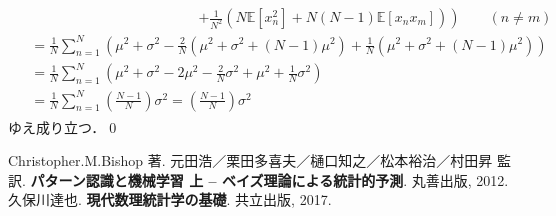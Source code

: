 \documentclass[uplatex,a4paper,oneside,openany,dvipdfmx]{jsarticle}
\numberwithin{equation}{section}
\theoremstyle{mystyle} %
\newcommand{\BE}{\mathbb{E}}
\newcommand{\tb}[1]{\textbf{#1}}
\begin{document}
\begin{description}
\begin{align}
\begin{aligned}
        &\qquad \qquad \qquad \qquad \qquad \qquad \left.+ \frac{1}{N^{2}} \left(N \BE[x_{n}^{2}] + N(N-1) \BE[x_{n}x_{m}]\right)\right) \qquad (n \neq m) \\
        &= \frac{1}{N} \sum_{n=1}^{N} \left(\mu^{2} + \sigma^{2} - \frac{2}{N} \left(\mu^{2} + \sigma^{2} + (N-1)\mu^{2}\right) + \frac{1}{N} \left(\mu^{2} + \sigma^{2} + (N-1)\mu^{2}\right)\right) \\
        &= \frac{1}{N} \sum_{n=1}^{N} \left(\mu^{2} + \sigma^{2} - 2 \mu^{2} - \frac{2}{N} \sigma^{2} + \mu^{2} + \frac{1}{N} \sigma^{2}\right) \\
        &= \frac{1}{N} \sum_{n=1}^{N} \left(\frac{N-1}{N}\right) \sigma^{2} = \left(\frac{N-1}{N}\right) \sigma^{2}
    \end{aligned}
\end{align}
ゆえ成り立つ．\qed

\end{description}

\newpage
\thispagestyle{plain}

\begin{thebibliography}{9}
     Christopher.M.Bishop 著. 元田浩／栗田多喜夫／樋口知之／松本裕治／村田昇 監訳. \tb{パターン認識と機械学習 上 -- ベイズ理論による統計的予測}. 丸善出版, 2012.
     久保川達也. \tb{現代数理統計学の基礎}. 共立出版, 2017.
\end{thebibliography}
\end{document}
